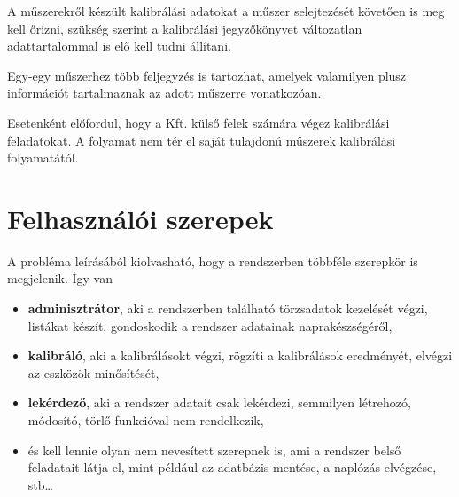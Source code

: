 \documentclass[a4paper,12pt]{report}
\begin{document}
A műszerekről készült kalibrálási adatokat a műszer selejtezését követően is 
meg kell őrizni, szükség szerint a kalibrálási jegyzőkönyvet változatlan 
adattartalommal is elő kell tudni állítani.

Egy-egy műszerhez több feljegyzés is tartozhat, amelyek valamilyen plusz 
információt tartalmaznak az adott műszerre vonatkozóan. 

Esetenként előfordul, hogy a Kft. külső felek számára végez kalibrálási 
feladatokat. A folyamat nem tér el saját tulajdonú műszerek kalibrálási 
folyamatától.

\section{Felhasználói szerepek}
A probléma leírásából kiolvasható, hogy a rendszerben többféle szerepkör is 
megjelenik. Így van
\begin{itemize}
 \item \textbf{adminisztrátor}, aki a rendszerben található törzsadatok 
kezelését végzi, listákat készít, gondoskodik a rendszer adatainak 
naprakészségéről,
\item \textbf{kalibráló}, aki a kalibrálásokt végzi, rögzíti a kalibrálások 
eredményét, elvégzi az eszközök minősítését,
\item \textbf{lekérdező}, aki a rendszer adatait csak lekérdezi, semmilyen 
létrehozó, módosító, törlő funkcióval nem rendelkezik,
\item és kell lennie olyan nem nevesített szerepnek is, ami a rendszer belső 
feladatait látja el, mint például az adatbázis mentése, a naplózás elvégzése, 
stb\dots
\end{itemize}
\end{document}
